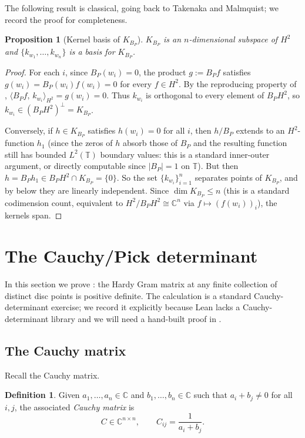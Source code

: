 \documentclass[12pt]{article}
\newtheorem{proposition}[theorem]{Proposition}
\theoremstyle{definition}
\newtheorem{definition}[theorem]{Definition}
\theoremstyle{remark}
\newcommand{\C}{\mathbb{C}}
\newcommand{\T}{\mathbb{T}}
\newcommand{\HHH}{H^{2}}
\newcommand{\KBP}{K_{B_{P}}}
\newcommand{\inner}[2]{\langle #1,\,#2\rangle}
\newcommand{\abs}[1]{\lvert #1 \rvert}
\begin{document}
The following result is classical, going back to Takenaka and Malmquist;
we record the proof for completeness.

\begin{proposition}[Kernel basis of $\KBP$]\label{prop:kernel-basis}
$\KBP$ is an $n$-dimensional subspace of $\HHH$ and
$\{k_{w_{1}},\dots,k_{w_{n}}\}$ is a basis for $\KBP$.
\end{proposition}

\begin{proof}
For each $i$, since $B_{P}(w_{i})=0$, the product
$g:=B_{P}f$ satisfies $g(w_{i})=B_{P}(w_{i})f(w_{i})=0$ for every
$f\in\HHH$. By the reproducing property of ,
$\inner{B_{P}f}{k_{w_{i}}}_{\HHH}=g(w_{i})=0$. Thus $k_{w_{i}}$ is
orthogonal to every element of $B_{P}\HHH$, so
$k_{w_{i}}\in(B_{P}\HHH)^{\perp}=\KBP$.

Conversely, if $h\in\KBP$ satisfies $h(w_{i})=0$ for all $i$, then
$h/B_{P}$ extends to an $\HHH$-function $h_{1}$ (since the zeros of $h$
absorb those of $B_{P}$ and the resulting function still has bounded
$L^{2}(\T)$ boundary values: this is a standard inner-outer argument, or
directly computable since $\abs{B_{P}}=1$ on $\T$). But then $h=B_{P}h_{1}\in B_{P}\HHH\cap\KBP=\{0\}$.
So the set $\{k_{w_{i}}\}_{i=1}^{n}$ separates points of $\KBP$, and by
 below they are linearly independent. Since
$\dim\KBP\le n$ (this is a standard codimension count, equivalent to
$\HHH/B_{P}\HHH\cong\C^{n}$ via $f\mapsto(f(w_{i}))_{i}$), the kernels span.
\end{proof}

\section{The Cauchy/Pick determinant}\label{sec:cauchy}

In this section we prove : the Hardy Gram matrix at
any finite collection of distinct disc points is positive definite. The
calculation is a standard Cauchy-determinant exercise; we record it
explicitly because Lean lacks a Cauchy-determinant library and we will
need a hand-built proof in .

\subsection{The Cauchy matrix}

Recall the Cauchy matrix.

\begin{definition}\label{def:cauchy-matrix}
Given $a_{1},\dots,a_{n}\in\C$ and $b_{1},\dots,b_{n}\in\C$ such that
$a_{i}+b_{j}\neq0$ for all $i,j$, the associated \emph{Cauchy matrix} is
\[
  C\in\C^{n\times n},\qquad C_{ij}=\frac{1}{a_{i}+b_{j}}.
\]
\end{definition}
\end{document}
